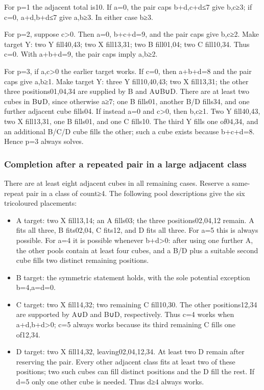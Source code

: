 \documentclass[
  10pt,
]{article}
\providecommand{\tightlist}{%
  \setlength{\itemsep}{0pt}\setlength{\parskip}{0pt}}
\begin{document}
For p=1 the adjacent total is10. If a=0, the pair caps b+d,c+d≤7 give
b,c≥3; if c=0, a+d,b+d≤7 give a,b≥3. In either case b≥3.

For p=2, suppose c\textgreater0. Then a=0, b+c+d=9, and the pair caps
give b,c≥2. Make target Y: two Y fill40,43; two X fill13,31; two B
fill01,04; two C fill10,34. Thus c=0. With a+b+d=9, the pair caps imply
a,b≥2.

For p=3, if a,c\textgreater0 the earlier target works. If c=0, then
a+b+d=8 and the pair caps give a,b≥1. Make target Y: three Y
fill10,40,43; two X fill13,31; the other three positions01,04,34 are
supplied by B and A∪B∪D. There are at least two cubes in B∪D, since
otherwise a≥7; one B fills01, another B/D fills34, and one further
adjacent cube fills04. If instead a=0 and c\textgreater0, then b,c≥1.
Two Y fill40,43, two X fill13,31, one B fills01, and one C fills10. The
third Y fills one of04,34, and an additional B/C/D cube fills the other;
such a cube exists because b+c+d=8. Hence p=3 always solves.

\hypertarget{completion-after-a-repeated-pair-in-a-large-adjacent-class}{%
\subsubsection*{Completion after a repeated pair in a large adjacent
class}\label{completion-after-a-repeated-pair-in-a-large-adjacent-class}}

There are at least eight adjacent cubes in all remaining cases. Reserve
a same-repeat pair in a class of count≥4. The following pool
descriptions give the six tricoloured placements:

\begin{itemize}
\tightlist
\item
  A target: two X fill13,14; an A fills03; the three positions02,04,12
  remain. A fits all three, B fits02,04, C fits12, and D fits all three.
  For a=5 this is always possible. For a=4 it is possible whenever
  b+d\textgreater0: after using one further A, the other pools contain
  at least four cubes, and a B/D plus a suitable second cube fills two
  distinct remaining positions.
\item
  B target: the symmetric statement holds, with the sole potential
  exception b=4,a=d=0.
\item
  C target: two X fill14,32; two remaining C fill10,30. The other
  positions12,34 are supported by A∪D and B∪D, respectively. Thus c=4
  works when a+d,b+d\textgreater0; c=5 always works because its third
  remaining C fills one of12,34.
\item
  D target: two X fill14,32, leaving02,04,12,34. At least two D remain
  after reserving the pair. Every other adjacent class fits at least two
  of these positions; two such cubes can fill distinct positions and the
  D fill the rest. If d=5 only one other cube is needed. Thus d≥4 always
  works.
\end{itemize}
\end{document}
